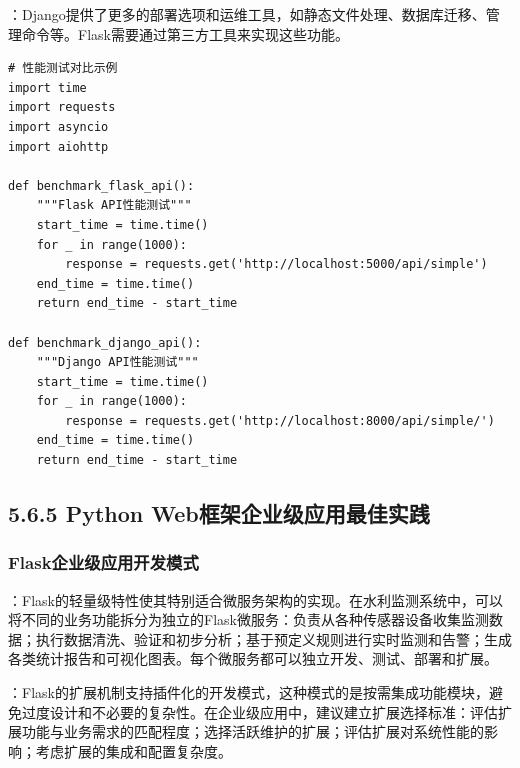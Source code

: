 ：Django提供了更多的部署选项和运维工具，如静态文件处理、数据库迁移、管理命令等。Flask需要通过第三方工具来实现这些功能。

\begin{lstlisting}[style=python]
# 性能测试对比示例
import time
import requests
import asyncio
import aiohttp

def benchmark_flask_api():
    """Flask API性能测试"""
    start_time = time.time()
    for _ in range(1000):
        response = requests.get('http://localhost:5000/api/simple')
    end_time = time.time()
    return end_time - start_time

def benchmark_django_api():
    """Django API性能测试"""
    start_time = time.time()
    for _ in range(1000):
        response = requests.get('http://localhost:8000/api/simple/')
    end_time = time.time()
    return end_time - start_time
\end{lstlisting}

\hypertarget{python-webux6846ux67b6ux4f01ux4e1aux7ea7ux5e94ux7528ux6700ux4f73ux5b9eux8df5}{%
\subsection{5.6.5 Python Web框架企业级应用最佳实践}\label{python-webux6846ux67b6ux4f01ux4e1aux7ea7ux5e94ux7528ux6700ux4f73ux5b9eux8df5}}

\hypertarget{flaskux4f01ux4e1aux7ea7ux5e94ux7528ux5f00ux53d1ux6a21ux5f0f}{%
\subsubsection{Flask企业级应用开发模式}\label{flaskux4f01ux4e1aux7ea7ux5e94ux7528ux5f00ux53d1ux6a21ux5f0f}}

：Flask的轻量级特性使其特别适合微服务架构的实现。在水利监测系统中，可以将不同的业务功能拆分为独立的Flask微服务：负责从各种传感器设备收集监测数据；执行数据清洗、验证和初步分析；基于预定义规则进行实时监测和告警；生成各类统计报告和可视化图表。每个微服务都可以独立开发、测试、部署和扩展。

：Flask的扩展机制支持插件化的开发模式，这种模式的是按需集成功能模块，避免过度设计和不必要的复杂性。在企业级应用中，建议建立扩展选择标准：评估扩展功能与业务需求的匹配程度；选择活跃维护的扩展；评估扩展对系统性能的影响；考虑扩展的集成和配置复杂度。

